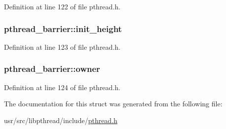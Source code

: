 Definition at line 122 of file pthread.\+h.

\hypertarget{structpthread__barrier_a71938bf4346ecc8a2f997f18df267ae0}{
\subsubsection[{init\+\_\+height}]{ pthread\+\_\+barrier\+::init\+\_\+height}}\label{structpthread__barrier_a71938bf4346ecc8a2f997f18df267ae0}


Definition at line 123 of file pthread.\+h.

\hypertarget{structpthread__barrier_a8ec820115bfcd6be50432579aac440fa}{
\subsubsection[{owner}]{ pthread\+\_\+barrier\+::owner}}\label{structpthread__barrier_a8ec820115bfcd6be50432579aac440fa}


Definition at line 124 of file pthread.\+h.



The documentation for this struct was generated from the following file\+:\begin{DoxyCompactItemize}
\item 
usr/src/libpthread/include/\hyperlink{pthread_8h}{pthread.\+h}\end{DoxyCompactItemize}
